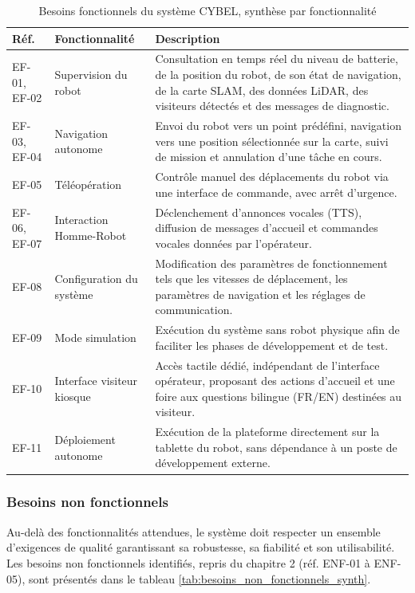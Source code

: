 \begin{table}[H]
\centering
\caption{Besoins fonctionnels du système CYBEL, synthèse par fonctionnalité}
\label{tab:besoins_fonctionnels_synth}
\begin{tabularx}{\textwidth}{|p{1.3cm}|p{3.3cm}|X|}
\hline
\textbf{Réf.} & \textbf{Fonctionnalité} & \textbf{Description} \\
\hline
EF-01, EF-02 & Supervision du robot &
Consultation en temps réel du niveau de batterie, de la position du robot,
de son état de navigation, de la carte SLAM, des données LiDAR, des
visiteurs détectés et des messages de diagnostic. \\
\hline
EF-03, EF-04 & Navigation autonome &
Envoi du robot vers un point prédéfini, navigation vers une position
sélectionnée sur la carte, suivi de mission et annulation d'une tâche en
cours. \\
\hline
EF-05 & Téléopération &
Contrôle manuel des déplacements du robot via une interface de commande,
avec arrêt d'urgence. \\
\hline
EF-06, EF-07 & Interaction Homme-Robot &
Déclenchement d'annonces vocales (TTS), diffusion de messages d'accueil et
commandes vocales données par l'opérateur. \\
\hline
EF-08 & Configuration du système &
Modification des paramètres de fonctionnement tels que les vitesses de
déplacement, les paramètres de navigation et les réglages de communication. \\
\hline
EF-09 & Mode simulation &
Exécution du système sans robot physique afin de faciliter les phases de
développement et de test. \\
\hline
EF-10 & Interface visiteur kiosque &
Accès tactile dédié, indépendant de l'interface opérateur, proposant des
actions d'accueil et une foire aux questions bilingue (FR/EN) destinées au
visiteur. \\
\hline
EF-11 & Déploiement autonome &
Exécution de la plateforme directement sur la tablette du robot, sans
dépendance à un poste de développement externe. \\
\hline
\end{tabularx}
\end{table}

\subsubsection{Besoins non fonctionnels}

Au-delà des fonctionnalités attendues, le système doit respecter un ensemble
d'exigences de qualité garantissant sa robustesse, sa fiabilité et son
utilisabilité. Les besoins non fonctionnels identifiés, repris du chapitre 2
(réf. ENF-01 à ENF-05), sont présentés dans le tableau
\ref{tab:besoins_non_fonctionnels_synth}.

